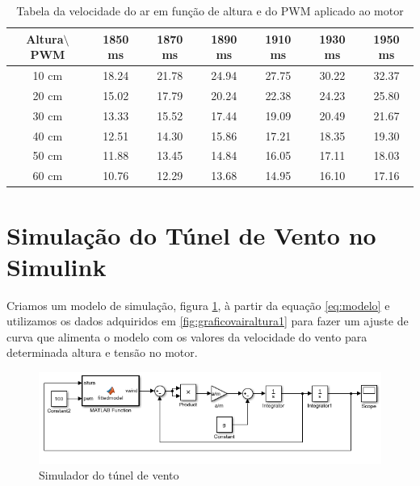 \begin{table}[htb]
	\centering
\begin{tabular}{|c|c|c|c|c|c|c|}
	\hline 
	Altura$\setminus$PWM & 1850 ms & 1870 ms & 1890 ms & 1910 ms & 1930 ms & 1950 ms \\ 
	\hline 
	10 cm & 18.24 & 21.78 & 24.94 & 27.75 & 30.22 & 32.37 \\ 
	\hline 
	20 cm & 15.02 & 17.79 & 20.24 & 22.38 & 24.23 & 25.80 \\ 
	\hline 
	30 cm & 13.33 & 15.52 & 17.44 & 19.09 & 20.49 & 21.67 \\ 
	\hline 
	40 cm & 12.51 & 14.30 & 15.86 & 17.21 & 18.35 & 19.30 \\ 
	\hline 
	50 cm & 11.88 & 13.45 & 14.84 & 16.05 & 17.11 & 18.03 \\ 
	\hline 
	60 cm & 10.76 & 12.29 & 13.68 & 14.95 & 16.10 & 17.16 \\ 
	\hline 
\end{tabular} 
\caption{Tabela da velocidade do ar em função de altura e do PWM aplicado ao motor}
\label{tb:varxalturapwm}
\end{table}

\section{Simulação do Túnel de Vento no Simulink}

Criamos um modelo de simulação, figura \ref{fig:simulador}, à partir da equação \ref{eq:modelo} e utilizamos os dados adquiridos em \ref{fig:graficovairaltura1} para fazer um ajuste de curva que alimenta o modelo com os valores da velocidade do vento para determinada altura e tensão no motor.

\begin{figure}[htb]
	\centering
	\includegraphics[width=1\linewidth]{simulador}
	\caption[Simulador do túnel de vento]{Simulador do túnel de vento}
	\label{fig:simulador}
\end{figure}

